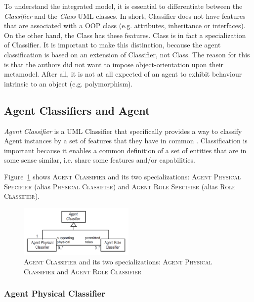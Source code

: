 To understand the integrated model, it is essential to differentiate between the \textit{Classifier} and the \textit{Class} UML classes.
In short, Classifier does not have features that are associated with a OOP class (e.g. attributes, inheritance or interfaces).
On the other hand, the Class has these features.
Class is in fact a specialization of Classifier.
It is important to make this distinction, because the agent classification is based on an extension of Classifier, not Class.
The reason for this is that the authors did not want to impose object-orientation upon their metamodel.
After all, it is not at all expected of an agent to exhibit behaviour intrinsic to an object (e.g. polymorphism). 

\subsection{Agent Classifiers and Agent}

\textit{Agent Classifier} is a UML Classifier that specifically provides a way to classify Agent instances by a set of features that they have in common \cite{Odell05}.
Classification is important because it enables a common definition of a set of entities that are in some sense similar, i.e. share some features and/or capabilities.

Figure~\ref{figure:onp-agent-classifiers} shows \textsc{Agent Classifier} and its two specializations: \textsc{Agent Physical Specifier} (alias \textsc{Physical Classifier}) and \textsc{Agent Role Specifier} (alias \textsc{Role Classifier}).

\begin{figure}[ht]
	\centering
	\includegraphics[width=0.5\textwidth]{images/onp/agent-classifiers.png}
	\caption{\textsc{Agent Classifier} and its two specializations: \textsc{Agent Physical Classifier} and \textsc{Agent Role Classifier}}
	\label{figure:onp-agent-classifiers}
\end{figure}

\subsubsection*{Agent Physical Classifier}

